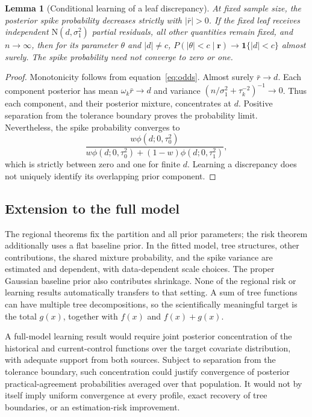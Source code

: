 \documentclass[11pt]{article}
\newcommand{\N}{\mathrm{N}}
\newcommand{\ind}{\mathbf{1}}
\newtheorem{lemma}{Lemma}[section]
\theoremstyle{remark}\newtheorem{remark}{Remark}[section]
\begin{document}
\begin{lemma}[Conditional learning of a leaf discrepancy]\label{lem:leaf_learning}
At fixed sample size, the posterior spike probability decreases strictly with $|\bar r|>0$. If the fixed leaf receives independent $\N(d,\sigma_1^2)$ partial residuals, all other quantities remain fixed, and $n\to\infty$, then for its parameter $\theta$ and $|d|\ne c$,
$P(|\theta|<c\mid\mathbf r)\to\ind\{|d|<c\}$ almost surely. The spike probability need not converge to zero or one.
\end{lemma}
\begin{proof}
Monotonicity follows from equation~\eqref{eq:odds}. Almost surely $\bar r\to d$. Each component posterior has mean $\omega_k\bar r\to d$ and variance $(n/\sigma_1^2+\tau_k^{-2})^{-1}\to0$. Thus each component, and their posterior mixture, concentrates at $d$. Positive separation from the tolerance boundary proves the probability limit. Nevertheless, the spike probability converges to
\[
\frac{w\phi(d;0,\tau_0^2)}{w\phi(d;0,\tau_0^2)+(1-w)\phi(d;0,\tau_1^2)},
\]
which is strictly between zero and one for finite $d$. Learning a discrepancy does not uniquely identify its overlapping prior component.
\end{proof}

\subsection{Extension to the full model}\label{sec:C.6}
The regional theorems fix the partition and all prior parameters; the risk theorem additionally uses a flat baseline prior. In the fitted model, tree structures, other contributions, the shared mixture probability, and the spike variance are estimated and dependent, with data-dependent scale choices. The proper Gaussian baseline prior also contributes shrinkage. None of the regional risk or learning results automatically transfers to that setting. A sum of tree functions can have multiple tree decompositions, so the scientifically meaningful target is the total $g(x)$, together with $f(x)$ and $f(x)+g(x)$.

A full-model learning result would require joint posterior concentration of the historical and current-control functions over the target covariate distribution, with adequate support from both sources. Subject to separation from the tolerance boundary, such concentration could justify convergence of posterior practical-agreement probabilities averaged over that population. It would not by itself imply uniform convergence at every profile, exact recovery of tree boundaries, or an estimation-risk improvement.
\end{document}
